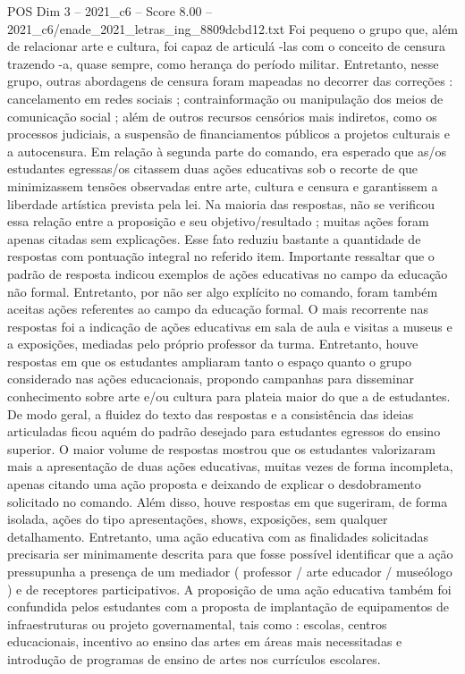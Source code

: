 \begin{textsample}{POS Dim 3 – 2021\_c6 – Score 8.00 – 2021\_c6/enade\_2021\_letras\_ing\_8809dcbd12.txt}
Foi pequeno o grupo que, além de relacionar arte e cultura, foi capaz de articulá -las com o conceito de censura trazendo -a, quase sempre, como herança do período militar.
Entretanto, nesse grupo, outras abordagens de censura foram mapeadas no decorrer das correções : cancelamento em redes sociais ; contrainformação ou manipulação dos meios de comunicação social ; além de outros recursos censórios mais indiretos, como os processos judiciais, a suspensão de financiamentos públicos a projetos culturais e a autocensura.
Em relação à segunda parte do comando, era esperado que as/os estudantes egressas/os citassem duas ações educativas sob o recorte de que minimizassem tensões observadas entre arte, cultura e censura e garantissem a liberdade artística prevista pela lei.
Na maioria das respostas, não se verificou essa relação entre a proposição e seu objetivo/resultado ; muitas ações foram apenas citadas sem explicações.
Esse fato reduziu bastante a quantidade de respostas com pontuação integral no referido item.
Importante ressaltar que o padrão de resposta indicou exemplos de ações educativas no campo da educação não formal.
Entretanto, por não ser algo explícito no comando, foram também aceitas ações referentes ao campo da educação formal.
O mais recorrente nas respostas foi a indicação de ações educativas em sala de aula e visitas a museus e a exposições, mediadas pelo próprio professor da turma.
Entretanto, houve respostas em que os estudantes ampliaram tanto o espaço quanto o grupo considerado nas ações educacionais, propondo campanhas para disseminar conhecimento sobre arte e/ou cultura para plateia maior do que a de estudantes.
De modo geral, a fluidez do texto das respostas e a consistência das ideias articuladas ficou aquém do padrão desejado para estudantes egressos do ensino superior.
O maior volume de respostas mostrou que os estudantes valorizaram mais a apresentação de duas ações educativas, muitas vezes de forma incompleta, apenas citando uma ação proposta e deixando de explicar o desdobramento solicitado no comando.
Além disso, houve respostas em que sugeriram, de forma isolada, ações do tipo apresentações, shows, exposições, sem qualquer detalhamento.
Entretanto, uma ação educativa com as finalidades solicitadas precisaria ser minimamente descrita para que fosse possível identificar que a ação pressupunha a presença de um mediador ( professor / arte educador / museólogo ) e de receptores participativos.
A proposição de uma ação educativa também foi confundida pelos estudantes com a proposta de implantação de equipamentos de infraestruturas ou projeto governamental, tais como : escolas, centros educacionais, incentivo ao ensino das artes em áreas mais necessitadas e introdução de programas de ensino de artes nos currículos escolares.

\end{textsample}
